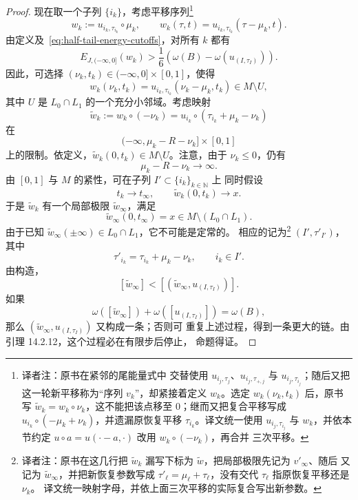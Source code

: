 \begin{proof}
现在取一个子列 $\{i_k\}$，考虑平移序列\footnote{译者注：原书在紧邻的尾能量式中
交替使用 $u_{i_j,\tau_j}$、$u_{i_j,\tau_{+,j}}$ 与 $u_{i_j,\tau_{i_j}}$；随后又把
这一轮新平移称为“序列 $v_k$”，却紧接着定义 $w_k$。选定
$w_k(\nu_k,t_k)$ 后，原书写 $\widetilde w_k=w_k\circ\nu_k$，这不能把该点移至
$0$；继而又把复合平移写成 $u_{i_k}\circ(-\mu_k+\nu_k)$，并遗漏原恢复平移
$\tau_{i_k}$。译文统一使用 $u_{i_j,\tau_{i_j}}$ 与 $w_k$，并依本节约定
$u\circ a=u(\mathord\cdot-a,\mathord\cdot)$ 改用 $w_k\circ(-\nu_k)$，再合并
三次平移。}
\[
  w_k:=u_{i_k,\tau_{i_k}}\circ\mu_k,
  \qquad
  w_k(\tau,t)=u_{i_k,\tau_{i_k}}(\tau-\mu_k,t).
\]
由定义及~\eqref{eq:half-tail-energy-cutoffs}，对所有 $k$ 都有
\[
  E_{J,(-\infty,0]}(w_k)
  >\frac16\left(
    \omega(B)-\omega(u_{(I,\tau_I)})
  \right).
\]
因此，可选择 $(\nu_k,t_k)\in(-\infty,0]\times[0,1]$，使得
\begin{equation}
  w_k(\nu_k,t_k)
  =u_{i_k,\tau_{i_k}}(\nu_k-\mu_k,t_k)
  \in M\setminus U,
\label{eq:new-recovery-point-outside-intersection}
\end{equation}
其中 $U$ 是 $L_0\cap L_1$ 的一个充分小邻域。考虑映射
\[
  \widetilde w_k
  :=w_k\circ(-\nu_k)
  =u_{i_k}\circ(\tau_{i_k}+\mu_k-\nu_k)
\]
在
\[
  (-\infty,\mu_k-R-\nu_k]\times[0,1]
\]
上的限制。依定义，$\widetilde w_k(0,t_k)\in M\setminus U$。注意，由于
$\nu_k\leq0$，仍有
\[
  \mu_k-R-\nu_k\longrightarrow\infty.
\]
由 $[0,1]$ 与 $M$ 的紧性，可在子列 $I'\subset\{i_k\}_{k\in\mathbb N}$ 上
同时假设
\[
  t_k\to t_\infty,
  \qquad
  \widetilde w_k(0,t_k)\to x.
\]
于是 $\widetilde w_k$ 有一个局部极限 $\widetilde w_\infty$，满足
\[
  \widetilde w_\infty(0,t_\infty)=x
  \in M\setminus(L_0\cap L_1).
\]
由于已知 $\widetilde w_\infty(\pm\infty)\in L_0\cap L_1$，它不可能是定常的。
相应的\termRecoveringPair{}记为\footnote{译者注：原书在这几行把
$\widetilde w_k$ 漏写下标为 $\widetilde w$，把局部极限先记为 $v'_\infty$、随后
又记为 $\widetilde w_\infty$，并把新恢复参数写成
$\tau'_\ell=\mu_\ell+\tau_\ell$，没有交代 $\tau_\ell$ 指原恢复平移还是 $\nu_k$。
译文统一映射字母，并依上面三次平移的实际复合写出新参数。}
$(I',\tau'_{I'})$，其中
\[
  \tau'_{i_k}=\tau_{i_k}+\mu_k-\nu_k,
  \qquad i_k\in I'.
\]
由构造，
\[
  [\widetilde w_\infty]
  <
  [(\widetilde w_\infty,u_{(I,\tau_I)})].
\]
如果
\[
  \omega([\widetilde w_\infty])
  +\omega([u_{(I,\tau_I)}])
  =\omega(B),
\]
那么 $(\widetilde w_\infty,u_{(I,\tau_I)})$ 又构成一条\termMaximalChain{}；否则可
重复上述过程，得到一条更大的链。由引理 14.2.12，这个过程必在有限步后停止，
命题得证。
\end{proof}

